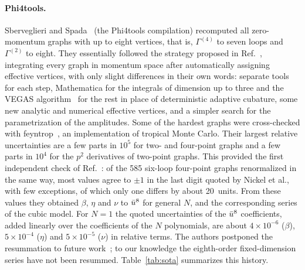\paragraph{Phi4tools.}
Sberveglieri and Spada~\cite{Phi4tools2024} (the Phi4tools compilation) recomputed all zero-momentum graphs with up to eight vertices, that is,
$\Gamma^{(4)}$ to seven loops and $\Gamma^{(2)}$ to eight. They essentially followed the strategy proposed in
Ref.~\cite{GuidaRibeca2006}, integrating every graph in momentum space after automatically assigning effective
vertices,
with only slight differences in their own words: separate tools for each step, Mathematica for the integrals of
dimension up to three and the VEGAS algorithm~\cite{Lepage1978} for the rest in place of deterministic adaptive
cubature, some new analytic and numerical effective vertices, and a simpler search for the parametrization of the
amplitudes. Some of the hardest graphs were cross-checked with feyntrop~\cite{feyntrop2024}, an implementation of
tropical Monte Carlo. Their largest relative uncertainties are a few parts in $10^5$ for two- and
four-point graphs and a few parts in $10^4$ for the $p^2$ derivatives of two-point graphs. This provided the first
independent check of Ref.~\cite{NMB1977}: of the 585 six-loop four-point graphs renormalized in the same way, most
values agree to $\pm1$ in the last digit quoted by Nickel et al., with few exceptions, of which only one differs by
about 20~units. From these values
they obtained $\beta$, $\eta$ and $\nu$ to $\bar u^{8}$ for general $N$, and the corresponding series of the cubic
model. For $N=1$ the quoted uncertainties of the $\bar u^8$ coefficients, added linearly over the coefficients of the
$N$ polynomials, are about $4\times10^{-6}$ ($\beta$), $5\times10^{-4}$ ($\eta$) and $5\times10^{-5}$ ($\nu$) in
relative terms. The authors postponed the resummation to future work~\cite{Phi4tools2024}; to our knowledge the
eighth-order fixed-dimension series have not been resummed. Table~\ref{tab:sota} summarizes this history.

